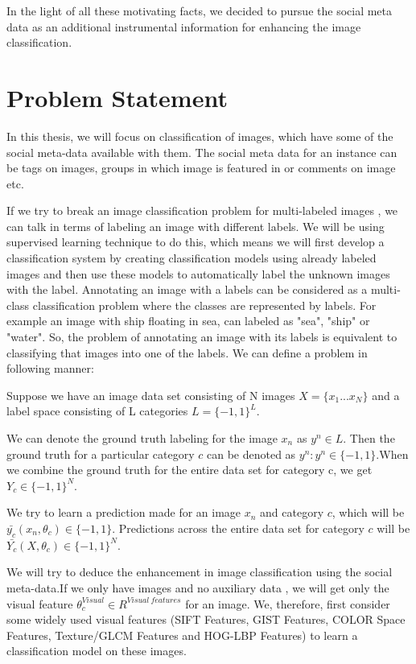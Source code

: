  In the light of all these motivating facts, we decided to pursue the social meta data as an additional instrumental information for enhancing the image classification.

\section{Problem Statement}
In this thesis, we will focus on classification of images, which have some of the social meta-data available with them. The social meta data for an instance can be  tags on images, groups in which image is featured in or comments on image etc. 

If we try to break an image classification problem for multi-labeled images , we can talk in terms of labeling an image with different labels. We will be using supervised learning technique to do this, which means we will first develop a classification system by creating classification models using already labeled images and then use these models to automatically label the unknown images with the label.
Annotating an image  with a labels can be considered as a multi-class classification problem where the classes are represented by labels. For example an image with ship floating in sea, can labeled as "sea", "ship" or "water". So, the problem of annotating an image with its labels is equivalent to classifying that images into one of the  labels. We can define a problem in following manner:

	Suppose we have an image data set consisting of N images $X = \{x_1 ...x_N\}$ and a label space consisting of L categories $L = \{-1, 1\}^L$. 
	
	We can denote the ground truth labeling for the image $x_n$ as $y^n\in L$. Then the ground truth for a particular category $c$ can be denoted as $y^n:y^n \in \{-1,1\}$.When we combine the ground truth for the entire data set for category c, we get $Y_c \in \{-1,1\}^N$. 
	
	 We try to learn a prediction made for an image $x_n$ and category $c$, which will be $\bar{y_c} (x_n,\theta_c)\in\{-1,1\} $. Predictions across the entire data set for category $c$ will be $\bar{Y_c}(X,\theta_c) \in \{-1,1\}^N$. 
	 
	 We will try to deduce the enhancement in image classification using the social meta-data.If we only have images and no auxiliary data , we will get only the visual feature  $\theta_c ^ {Visual} \in R^{Visual\ features}$ for an image. We, therefore, first consider some widely used visual features (SIFT Features, GIST Features,  COLOR Space Features, Texture/GLCM Features and HOG-LBP Features) to learn a classification model on these images.
	 

